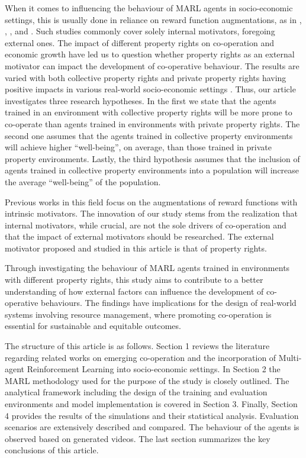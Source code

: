 \documentclass[preprint,12pt,authoryear]{elsarticle}
\begin{document}
When it comes to influencing the behaviour of MARL agents in socio-economic settings, this is usually done in reliance on reward function augmentations, as in \cite{Willis2023a}, \cite{Willis2023b}, \cite{Peysakhovich2017}, and \cite{Hughes2018}. Such studies commonly cover solely internal motivators, foregoing external ones. The impact of different property rights on co-operation and economic growth have led us to question whether property rights as an external motivator can impact the development of co-operative behaviour. The results are varied with both collective property rights and private property rights having positive impacts in various real-world socio-economic settings \citep{anderson2003property, Ostrom1990, Jaffe1996, Haydarolu2015, Baragwanath2023, montero2022cooperative}. Thus, our article investigates three research hypotheses. In the first we state that the agents trained in an environment with collective property rights will be more prone to co-operate than agents trained in environments with private property rights. The second one assumes that the agents trained in collective property environments will achieve higher “well-being”, on average, than those trained in private property environments. Lastly, the third hypothesis assumes that the inclusion of agents trained in collective property environments into a population will increase the average “well-being” of the population.

Previous works in this field focus on the augmentations of reward functions with intrinsic motivators. The innovation of our study stems from the realization that internal motivators, while crucial, are not the sole drivers of co-operation and that the impact of external motivators should be researched. The external motivator proposed and studied in this article is that of property rights.

Through investigating the behaviour of MARL agents trained in environments with different property rights, this study aims to contribute to a better understanding of how external factors can influence the development of co-operative behaviours. The findings have implications for the design of real-world systems involving resource management, where promoting co-operation is essential for sustainable and equitable outcomes.

The structure of this article is as follows. Section 1 reviews the literature regarding related works on emerging co-operation and the incorporation of Multi-agent Reinforcement Learning into socio-economic settings. In Section 2 the MARL methodology used for the purpose of the study is closely outlined. The analytical framework including the design of the training and evaluation environments and model implementation is covered in Section 3. Finally, Section 4 provides the results of the simulations and their statistical analysis. Evaluation scenarios are extensively described and compared. The behaviour of the agents is observed based on generated videos. The last section summarizes the key conclusions of this article.
\end{document}
